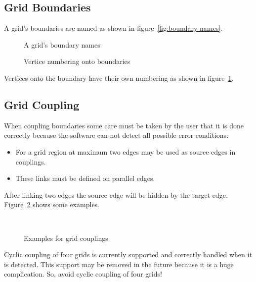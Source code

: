 \subsection{Grid Boundaries}
\label{sec:grid-boundaries}

A grid's boundaries are named as shown in figure~\ref{fig:boundary-names}.
\begin{figure}
  \begin{maxipage}
    \hfil
    \begin{minipage}{.485\linewidth}
      \centering
      
      \caption{A grid's boundary names}
      \label{fig:boundary-names}
    \end{minipage}
    \hfil
    \begin{minipage}{.485\linewidth}
      \centering
      
      \caption{Vertice numbering onto boundaries}
      \label{fig:Vertice-numbering-onto-boundaries}
    \end{minipage}
    \hfil
  \end{maxipage}
\end{figure}
Vertices onto the boundary have their own numbering as shown in
figure~\ref{fig:Vertice-numbering-onto-boundaries}.


\subsection{Grid Coupling}
\label{sec:grid-coupling}

When coupling boundaries some care must be taken by the user that it
is done correctly because the software can not detect all possible
error conditions:
\begin{itemize}
\item For a grid region at maximum two edges may be used as source
  edges in couplings.
\item These links must be defined on parallel edges.
\end{itemize}
After linking two edges the source edge will be hidden by the target
edge.  Figure~\ref{fig:GridCouplings} shows some examples.
\begin{figure}
  \begin{maxipage}
    \centering
    \hfil
     \hfil
     \hfil \\[2\bigskipamount]
    \caption{Examples for grid couplings}
    \label{fig:GridCouplings}
  \end{maxipage}
\end{figure}
Cyclic coupling of four grids is currently supported and correctly
handled when it is detected.  This support may be removed in the
future because it is a huge complication. So, avoid cyclic coupling of
four grids!



